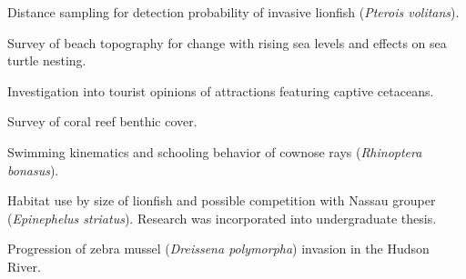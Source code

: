 \documentclass[a4paper]{deedy-resume} %
\begin{document}
\begin{flushleft}

\sectionspace



\begin{tightitemize}
\item Distance sampling for detection probability of invasive lionfish (\textit{Pterois volitans}).
\item Survey of beach topography for change with rising sea levels and effects on sea turtle nesting.
\item Investigation into tourist opinions of attractions featuring captive cetaceans.
\item Survey of coral reef benthic cover.
\end{tightitemize}

\sectionspace %



Swimming kinematics and schooling behavior of cownose rays (\textit{Rhinoptera bonasus}).

\sectionspace %



Habitat use by size of lionfish and possible competition with Nassau grouper (\textit{Epinephelus striatus}). Research was incorporated into undergraduate thesis.

\sectionspace %



Progression of zebra mussel (\textit{Dreissena polymorpha}) invasion in the Hudson River.


\end{flushleft}
\end{document}
